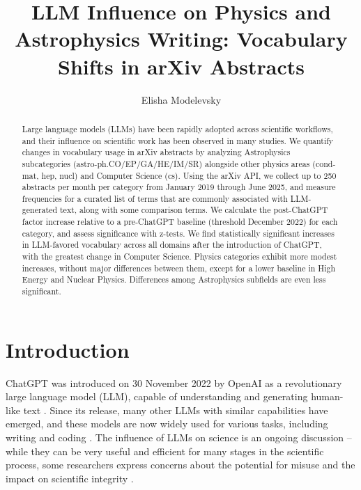 \documentclass[twocolumn]{aastex701}
\begin{document}
\title{LLM Influence on Physics and Astrophysics Writing: Vocabulary Shifts in arXiv Abstracts}

\author[orcid=0000-0003-4105-3443]{Elisha Modelevsky}

\begin{abstract}

Large language models (LLMs) have been rapidly adopted across scientific workflows, and their influence on scientific work has been observed in many studies.
We quantify changes in vocabulary usage in arXiv abstracts by analyzing Astrophysics subcategories (astro-ph.CO/EP/GA/HE/IM/SR) alongside other physics areas (cond-mat, hep, nucl) and Computer Science (cs).
Using the arXiv API, we collect up to 250 abstracts per month per category from January 2019 through June 2025, and measure frequencies for a curated list of terms that are commonly associated with LLM-generated text, along with some comparison terms.
We calculate the post-ChatGPT factor increase relative to a pre-ChatGPT baseline (threshold December 2022) for each category, and assess significance with z-tests.
We find statistically significant increases in LLM-favored vocabulary across all domains after the introduction of ChatGPT, with the greatest change in Computer Science.
Physics categories exhibit more modest increases, without major differences between them, except for a lower baseline in High Energy and Nuclear Physics.
Differences among Astrophysics subfields are even less significant.


\end{abstract}


\section{Introduction} 

ChatGPT was introduced on 30 November 2022 by OpenAI as a revolutionary large language model (LLM), capable of understanding and generating human-like text \citep{Roumeliotis2023}.
Since its release, many other LLMs with similar capabilities have emerged, and these models are now widely used for various tasks, including writing and coding \citep{Minaee2024}.
The influence of LLMs on science is an ongoing discussion -- while they can be very useful and efficient for many stages in the scientific process, some researchers express concerns about the potential for misuse and the impact on scientific integrity \citep{Zhang2025}.
\end{document}
